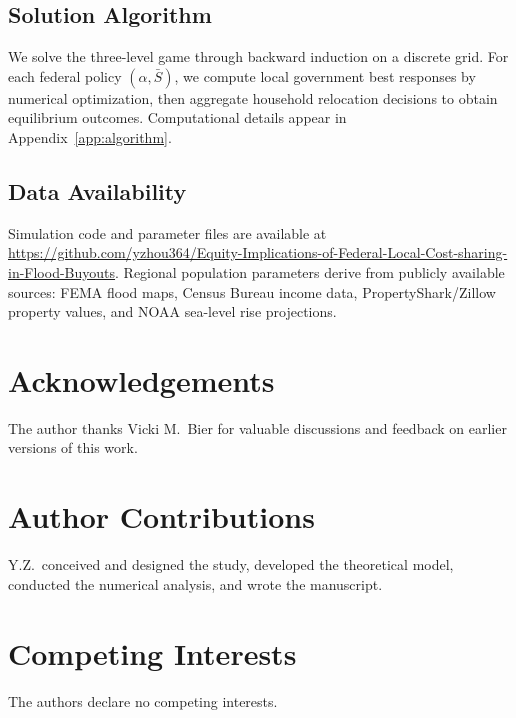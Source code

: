 \documentclass[11pt,letterpaper]{article}
\theoremstyle{definition}
\begin{document}
\subsection{Solution Algorithm}

We solve the three-level game through backward induction on a discrete grid. For each federal policy $(\alpha, \bar{S})$, we compute local government best responses by numerical optimization, then aggregate household relocation decisions to obtain equilibrium outcomes. Computational details appear in Appendix~\ref{app:algorithm}.

\subsection{Data Availability}

Simulation code and parameter files are available at \url{https://github.com/yzhou364/Equity-Implications-of-Federal-Local-Cost-sharing-in-Flood-Buyouts}. Regional population parameters derive from publicly available sources: FEMA flood maps, Census Bureau income data, PropertyShark/Zillow property values, and NOAA sea-level rise projections.


\section*{Acknowledgements}
The author thanks Vicki M.\ Bier for valuable discussions and feedback on earlier versions of this work.

\section*{Author Contributions}
Y.Z.\ conceived and designed the study, developed the theoretical model, conducted the numerical analysis, and wrote the manuscript.

\section*{Competing Interests}
The authors declare no competing interests.

\end{document}
